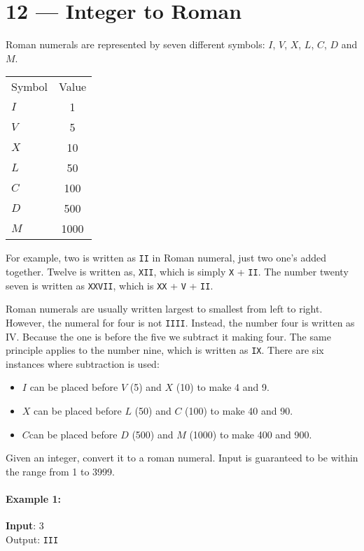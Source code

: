\section{12 --- Integer to Roman}
Roman numerals are represented by seven different symbols: $I$, $V$, $X$, $L$, $C$, $D$ and $M$.
\begin{table}[H]
\begin{tabular}{lc}
Symbol  & Value\\
$ I $   & 1\\
$ V $  &   5\\
$ X $    & 10 \\
$ L $  & 50 \\
$ C $  & 100 \\
$ D $ & 500 \\
$ M $  & 1000
\end{tabular}
\end{table}
For example, two is written as \texttt{II} in Roman numeral, just two one's added together. Twelve is written as, \texttt{XII}, which is simply \texttt{X} + \texttt{II}. The number twenty seven is written as \texttt{XXVII}, which is \texttt{XX} + \texttt{V} + \texttt{II}.
\par
Roman numerals are usually written largest to smallest from left to right. However, the numeral for four is not \texttt{IIII}. Instead, the number four is written as IV. Because the one is before the five we subtract it making four. The same principle applies to the number nine, which is written as \texttt{IX}. There are six instances where subtraction is used:

\begin{itemize}
\item $ I $ can be placed before $ V $ (5) and $ X $ (10) to make 4 and 9. 
\item $ X $ can be placed before $ L $ (50) and $ C $ (100) to make 40 and 90. 
\item $ C  $can be placed before $ D $ (500) and $ M $ (1000) to make 400 and 900.
\end{itemize}

Given an integer, convert it to a roman numeral. Input is guaranteed to be within the range from 1 to 3999.

\paragraph{Example 1:}

\begin{flushleft}
\textbf{Input}: 3
\\
Output: \texttt{III}
\end{flushleft}

